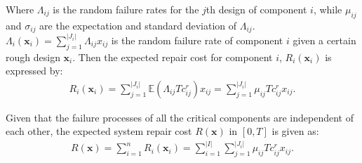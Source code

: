 \documentclass[preprint,12pt]{elsarticle}
\begin{document}
Where $\Lambda_{ij}$ is the random failure rates for the $j$th design of component $i$, while $\mu_{ij}$ and $\sigma_{ij}$ are the expectation and standard deviation of $\Lambda_{ij}$. $\Lambda_{i}(\boldsymbol{x}_{i})=\sum_{j=1}^{\rvert J_{i} \lvert}{\Lambda_{ij}x_{ij}}$ is the random failure rate of component $i$ given a certain rough design $\boldsymbol{x}_{i}$. Then the expected repair cost for component $i$, $R_{i}(\boldsymbol{x}_{i})$ is expressed by:
\begin {eqnarray}
R_{i}(\boldsymbol{x}_{i}) = \sum_{j=1}^{\rvert J_{i} \lvert}{\mathbb{E}(\Lambda_{ij}Tc^r_{ij})x_{ij}}= \sum_{j=1}^{\rvert J_{i} \lvert}{\mu_{ij}Tc^r_{ij}}x_{ij}. \label{ERi}
\end {eqnarray}

Given that the failure processes of all the critical components are independent of each other, the expected system repair cost $R(\boldsymbol{x})$ in $[0,T]$ is given as:
\begin {eqnarray}
 R(\boldsymbol{x}) = \sum_{i=1}^{n}{R_{i}(\boldsymbol{x}_{i})} = \sum_{i=1}^{\rvert I \lvert}\sum_{j=1}^{\rvert J_{i} \lvert}{\mu_{ij}Tc^r_{ij}}x_{ij}.\label{ER}
\end {eqnarray}

\end{document}
